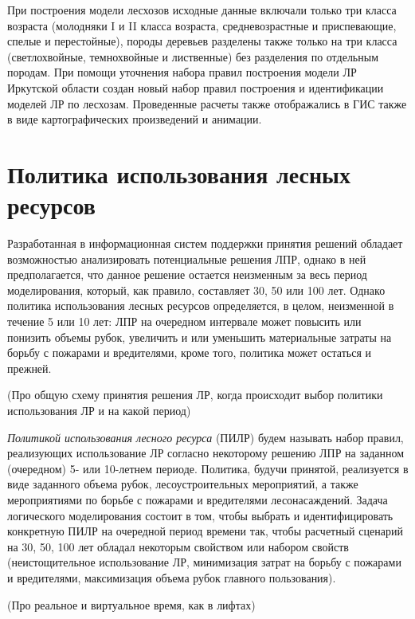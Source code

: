При построения модели лесхозов исходные данные включали только три класса возраста (молодняки I и II класса возраста, средневозрастные и приспевающие, спелые и перестойные), породы деревьев разделены также только на три класса (светлохвойные, темнохвойные и лиственные) без разделения по отдельным породам. При помощи уточнения набора правил построения модели ЛР Иркутской области создан новый набор правил построения и идентификации моделей ЛР по лесхозам. Проведенные расчеты также отображались в ГИС также в виде картографических произведений и анимации.

\section{Политика использования лесных ресурсов}

Разработанная в \cite{dissAsya} информационная систем поддержки принятия решений обладает возможностью анализировать потенциальные решения ЛПР, однако в ней предполагается, что данное решение остается неизменным за весь период моделирования, который, как правило, составляет 30, 50 или 100 лет. Однако политика использования лесных ресурсов определяется, в целом, неизменной в течение 5 или 10 лет: ЛПР на очередном интервале может повысить или понизить объемы рубок, увеличить и или уменьшить материальные затраты на борьбу с пожарами и вредителями, кроме того, политика может остаться и прежней. %

(Про общую схему принятия решения ЛР, когда происходит выбор политики использования ЛР и на какой период)

\emph{Политикой использования лесного ресурса} (ПИЛР) будем называть набор правил, реализующих использование ЛР согласно некоторому решению ЛПР на заданном (очередном) 5- или 10-летнем периоде. Политика, будучи принятой, реализуется в виде заданного объема рубок, лесоустроительных мероприятий, а также мероприятиями по борьбе с пожарами и вредителями лесонасаждений. Задача логического моделирования состоит в том, чтобы выбрать и идентифицировать конкретную ПИЛР на очередной период времени так, чтобы расчетный сценарий на 30, 50, 100 лет обладал некоторым свойством или набором свойств (неистощительное использование ЛР, минимизация затрат на борьбу с пожарами и вредителями, максимизация объема рубок главного пользования).

(Про реальное и виртуальное время, как в лифтах)


